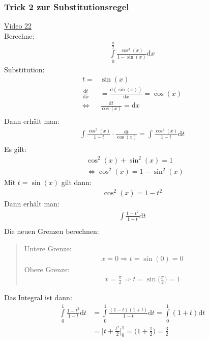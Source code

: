 \subsubsection{Trick 2 zur Substitutionsregel}
\href{https://youtu.be/ECFaj8YJlws}{Video 22}\\
Berechne:\\
\begin{align*}
\int\limits_{0}^{\frac{\pi}{2}}\frac{\cos^3(x)}{1-\sin(x)} \mathrm{d}x
\end{align*}
Substitution:\\
\begin{align*}
t=&\sin(x)\\
\frac{\mathrm{d}t}{\mathrm{d}x}&=\frac{\mathrm{d}(\sin(x))}{\mathrm{d}x}=\cos(x)\\
\Leftrightarrow&\frac{\mathrm{d}t}{\cos(x)}=\mathrm{d}x\\
\end{align*}
Dann erhält man:\\
\begin{align*}
\int\limits_{}^{} \frac{\cos^3(x)}{1-t}\cdot\frac{\mathrm{d}t}{\cos(x)}=\int\limits_{}^{} \frac{\cos^2(x)}{1-t}\mathrm{d}t
\end{align*}
Es gilt:\\
\begin{align*}
&\cos^2(x)+\sin^2(x)=1\\
&\Leftrightarrow \cos^2(x)=1-\sin^2(x)
\end{align*}
Mit $ t=\sin(x) $ gilt dann:\\
\begin{align*}
\cos^2(x)=1-t^2
\end{align*}
Dann erhält man:\\
\begin{align*}
\int\limits_{}^{} \frac{1-t^2}{1-t}\mathrm{d}t
\end{align*}
Die neuen Grenzen berechnen:\\
\begin{quote}
	Untere Grenze:\\
	\begin{align*}
	x=0\Rightarrow t=\sin(0)=0
	\end{align*}
	Obere Grenze:\\
	\begin{align*}
	x=\frac{\pi}{2}\Rightarrow t=\sin\bigg(\frac{\pi}{2}\bigg)=1
	\end{align*}
\end{quote}
Das Integral ist dann:\\
\begin{align*}
\int\limits_{0}^{1} \frac{1-t^2}{1-t}\mathrm{d}t&=\int\limits_{0}^{1} \frac{(1-t)(1+t)}{1-t}\mathrm{d}t=\int\limits_{0}^{1}(1+t)\mathrm{d}t\\ 
&=\bigg[t+\frac{t^2}{2}\bigg]^1_0=\bigg(1+\frac{1}{2}\bigg)=\frac{3}{2}
\end{align*}
